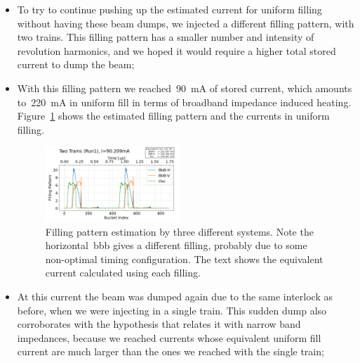 \documentclass[a4paper,
               biblatex,     %
               ]{jacow}
\begin{document}
\begin{itemize}
    \item To try to continue pushing up the estimated current for uniform filling without having these beam dumps, we injected a different filling pattern, with two trains. This filling pattern has a smaller number and intensity of revolution harmonics, and we hoped it would require a higher total stored current to dump the beam;
    \item With this filling pattern we reached~\SI{90}{\milli\ampere} of stored current, which amounts to~\SI{220}{\milli\ampere} in uniform fill in terms of broadband impedance induced heating. Figure~\ref{fig:2023-07-25_twotrain_fill} shows the estimated filling pattern and the currents in uniform filling.
    \begin{figure}
        \centering
        \includegraphics[width=0.48\textwidth]{2023-07-25_twotrains_run1_curr90p209mA.png}
        \caption{Filling pattern estimation by three different systems. Note the horizontal~\gls{bbb} gives a different filling, probably due to some non-optimal timing configuration. The text shows the equivalent current calculated using each filling.}
        \label{fig:2023-07-25_twotrain_fill}
    \end{figure}
    \item At this current the beam was dumped again due to the same interlock as before, when we were injecting in a single train. This sudden dump also corroborates with the hypothesis that relates it with narrow band impedances, because we reached currents whose equivalent uniform fill current are much larger than the ones we reached with the single train;
\end{itemize}
\end{document}
